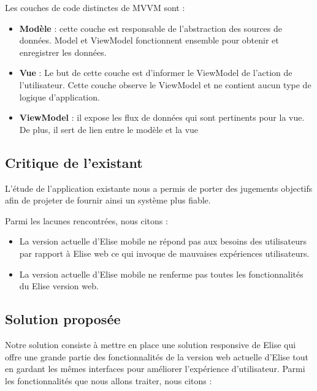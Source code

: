Les couches de code distinctes de MVVM sont :
\begin{itemize}
  \item \textbf{Modèle} : cette couche est responsable de l'abstraction des sources de données. Model et ViewModel fonctionnent ensemble pour obtenir et enregistrer les données.\cite{mvvm}
  \item \textbf{Vue} : Le but de cette couche est d'informer le ViewModel de l'action de l'utilisateur. Cette couche observe le ViewModel et ne contient aucun type de logique d'application.\cite{mvvm}
  \item \textbf{ViewModel} : il expose les flux de données qui sont pertinents pour la vue. De plus, il sert de lien entre le modèle et la vue\cite{mvvm}
\end{itemize}



\subsection{Critique de l'existant}
L'étude de l'application existante nous a permis de porter des jugements objectifs afin de projeter de fournir ainsi un système plus fiable.

Parmi les lacunes rencontrées, nous citons :
\begin{itemize}
  \item La version actuelle d'Elise mobile ne répond pas aux besoins des utilisateurs par rapport à Elise web ce qui invoque de mauvaises expériences utilisateurs.
  \item La version actuelle d'Elise mobile ne renferme pas toutes les fonctionnalités du Elise version web.
\end{itemize}

\subsection{Solution proposée}
Notre solution consiste à mettre en place une solution responsive de Elise qui offre une grande partie des fonctionnalités de la version web actuelle d'Elise tout en gardant les mêmes interfaces pour améliorer l'expérience d'utilisateur. Parmi les fonctionnalités que nous allons traiter, nous citons :

